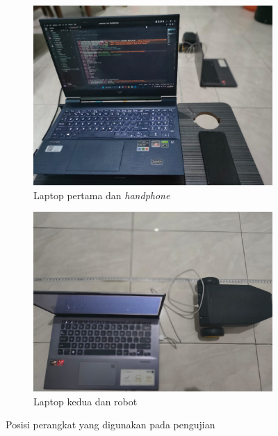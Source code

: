 \begin{figure}[H]
  \begin{subfigure}{0.7\linewidth}
    \includegraphics[width=\linewidth]{../Gambar/laptop1.jpg}
    \caption{Laptop pertama dan \emph{handphone}}
    \label{fig:laptop1}
  \end{subfigure}
  \begin{subfigure}{0.7\linewidth}
    \includegraphics[width=\linewidth]{../Gambar/laptop2.jpg}
    \caption{Laptop kedua dan robot}
    \label{fig:laptop}
  \end{subfigure}
  \centering
  \caption{Posisi perangkat yang digunakan pada pengujian}
  \label{fig:posisisaatpengujianjarak}
\end{figure}

